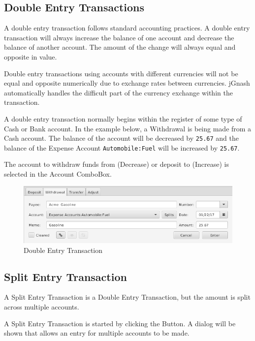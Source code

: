 \documentclass[letterpaper,12pt]{book}
\begin{document}
    \subsection{Double Entry Transactions}
    A double entry transaction follows standard accounting practices. A double entry transaction will always
    increase the balance of one account and decrease the balance of another account. The amount of the change will
    always equal and opposite in value.

    \begin{mdframed}[style=info]
        Double entry transactions using accounts with different currencies will not be equal and opposite numerically due
        to exchange rates between currencies. jGnash automatically handles the difficult part of the currency exchange
        within the transaction.
    \end{mdframed}

    A double entry transaction normally begins within the register of some type of Cash or Bank account.
    In the example below, a Withdrawal is being made from a Cash account. The balance of the account will be decreased
    by \texttt{25.67} and the balance of the Expense Account \texttt{Automobile:Fuel} will be increased by \texttt{25.67}.

    The account to withdraw funds from (Decrease) or deposit to (Increase) is selected in the Account ComboBox.


    \begin{figure}[h]
        \caption{Double Entry Transaction}
        \includegraphics[width=0.9\linewidth]{images/basicDoubleEntry}
    \end{figure}

    \subsection{Split Entry Transaction}
    A Split Entry Transaction is a Double Entry Transaction, but the amount is split across multiple accounts.

    A Split Entry Transaction is started by clicking the  Button. A dialog will be shown that allows an entry
    for multiple accounts to be made.
\end{document}
